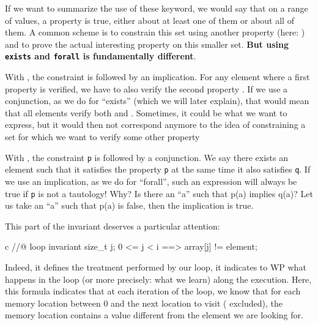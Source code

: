 If we want to summarize the use of these keyword, we would say that on a
range of values, a property is true, either about at least one of them
or about all of them. A common scheme is to constrain this set using
another property (here: ) and to prove the
actual interesting property on this smaller set. \textbf{But using
\texttt{exists} and \texttt{forall} is fundamentally different}.



With ,
the constraint  is followed by an implication.
For any element where a first property  is verified, we have
to also verify the second property . If we use a conjunction,
as we do for ``exists'' (which we will later explain), that would mean that
all elements verify both  and . Sometimes, it
could be what we want to express, but it would then not correspond
anymore to the idea of constraining a set for which we want to verify
some other property



With , the
constraint \texttt{p} is followed by a conjunction. We say there exists
an element such that it satisfies the property \texttt{p} at the same
time it also satisfies \texttt{q}. If we use an implication, as we do
for ``forall'', such an expression will always be true if \texttt{p} is
not a tautology! Why? Is there an ``a'' such that p(a) implies q(a)? Let
us take an ``a'' such that p(a) is false, then the implication is true.



This part of the invariant deserves a particular attention:



\begin{CodeBlock}{c}
//@ loop invariant \forall size_t j; 0 <= j < i ==> array[j] != element;
\end{CodeBlock}



Indeed, it defines the treatment performed by our loop, it indicates to
WP what happens in the loop (or more precisely: what we learn) along
the execution. Here, this formula indicates that at each iteration of
the loop, we know that for each memory location between 0 and the next
location to visit ( excluded), the memory location contains a
value different from the element we are looking for.

